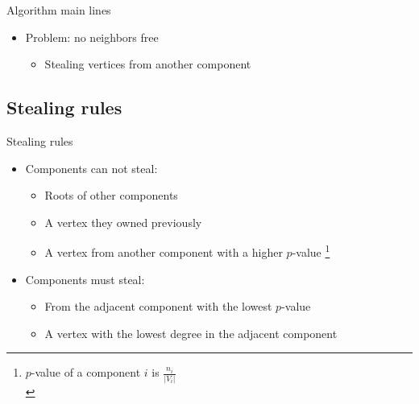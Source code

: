 \begin{frame}{Algorithm main lines}
  \begin{itemize}
  \item Problem: no neighbors free
    \begin{itemize}
    \item Stealing vertices from another component
    \end{itemize}
  \end{itemize}
  \begin{center}
  \end{center}
\end{frame}

\subsection{Stealing rules}

\begin{frame}{Stealing rules}
  \begin{itemize}
  \item Components can not steal:
    \begin{itemize}
    \item Roots of other components
    \item A vertex they owned previously
    \item A vertex from another component with a higher $p$-value
\footnote{$p$-value of a component $i$ is $\frac{n_i}{|V_i|}$\\}
    \end{itemize}
  \item Components must steal:
    \begin{itemize}
    \item From the adjacent component with the lowest $p$-value
    \item A vertex with the lowest degree in the adjacent component
    \end{itemize}
  \end{itemize}
\end{frame}

